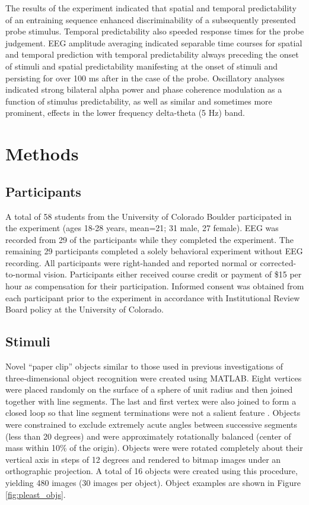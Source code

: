 \documentclass[dwyatte_dissertation.tex]{subfiles}
\begin{document}
The results of the experiment indicated that spatial and temporal predictability of an entraining sequence enhanced discriminability of a subsequently presented probe stimulus. Temporal predictability also speeded response times for the probe judgement. EEG amplitude averaging indicated separable time courses for spatial and temporal prediction with temporal predictability always preceding the onset of stimuli and spatial predictability manifesting at the onset of stimuli and persisting for over 100 ms after in the case of the probe. Oscillatory analyses indicated strong bilateral alpha power and phase coherence modulation as a function of stimulus predictability, as well as similar and sometimes more prominent, effects in the lower frequency delta-theta (5 Hz) band. 

\section{Methods}

\subsection{Participants}
A total of 58 students from the University of Colorado Boulder participated in the experiment (ages 18-28 years, mean=21; 31 male, 27 female). EEG was recorded from 29 of the participants while they completed the experiment. The remaining 29 participants completed a solely behavioral experiment without EEG recording. All participants were right-handed and reported normal or corrected-to-normal vision. Participants either received course credit or payment of \$15 per hour as compensation for their participation. Informed consent was obtained from each participant prior to the experiment in accordance with Institutional Review Board policy at the University of Colorado.

\subsection{Stimuli}
Novel ``paper clip'' objects similar to those used in previous investigations of three-dimensional object recognition \cite{BulthoffEdelman92,EdelmanBulthoff92,LogothetisPaulsBulthoffEtAl94,LogothetisPaulsPoggio95,SinhaPoggio96} were created using MATLAB. Eight vertices were placed randomly on the surface of a sphere of unit radius and then joined together with line segments. The last and first vertex were also joined to form a closed loop so that line segment terminations were not a salient feature \cite{BalasSinha09b}. Objects were constrained to exclude extremely acute angles between successive segments (less than 20 degrees) and were approximately rotationally balanced (center of mass within 10\% of the origin). Objects were were rotated completely about their vertical axis in steps of 12 degrees and rendered to bitmap images under an orthographic projection. A total of 16 objects were created using this procedure, yielding 480 images (30 images per object). Object examples are shown in Figure \ref{fig:pleast_objs}.
\end{document}
